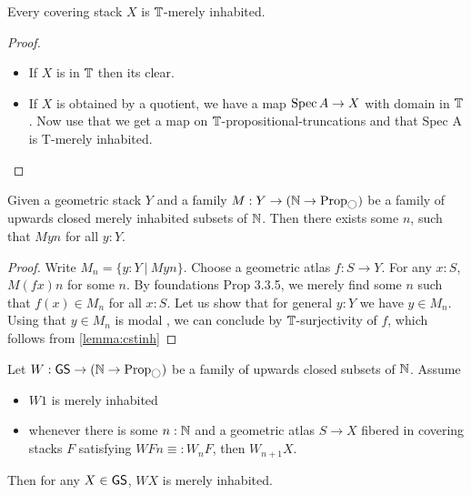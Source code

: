 \begin{lemma}{\label{lemma:cstinh}}
	Every covering stack $X$ is $\mathbb{T}$-merely inhabited.
\end{lemma}
\begin{proof} 
	\begin{itemize}
		\item If $X$ is in $\mathbb{T}$ then its clear.
		\item  If $X$ is obtained by a quotient, we have a map $\operatorname{Spec} A \to X$ with domain in $\mathbb{T}$. Now use that we get a map on $\mathbb{T}$-propositional-truncations and that Spec A is T-merely inhabited.
	\end{itemize}
\end{proof}
\begin{prop}{\label{prop:FindCommonN}}
	Given a geometric stack $Y$ and a family $M : Y \to (\bN \to \Prop_{\ci})$  be a family of upwards closed merely inhabited subsets of $\mathbb{N}$. Then there exists some $n$, such that $M y n$ for all $y : Y$.
\end{prop}
\begin{proof}
	Write $M_n = \{y : Y \ | \ M y n\}$.
	Choose a geometric atlas $f : S \to Y$.
	For any $x : S$, $M(f x) n$ for some $n$. By foundations Prop 3.3.5, we merely find some $n$ such that $f(x) \in M_n$ for all $x : S$. Let us show that for general $y : Y$ we have $y \in M_n$. Using that $y \in M_n$ is modal , we can conclude by $\mathbb{T}$-surjectivity of $f$, which follows from \ref{lemma:cstinh}
	
\end{proof}
\begin{prop}{\label{prop:OneToRuleThemAll}}
	Let $W : \GS \to (\bN \to \Prop_{\ci})$ be a family of upwards closed subsets of $\mathbb{N}$. Assume
	\begin{itemize}
		\item $W 1$ is merely inhabited
		\item whenever there is some $n : \mathbb{N}$ and a geometric atlas $S \to X$ fibered in covering stacks $F$ satisfying $W F n \equiv: W_n F$, then $W_{n+1} X$.
	\end{itemize}  %
	Then for any $X \in \mathsf{GS}$, $W X$ is merely inhabited.
\end{prop}
